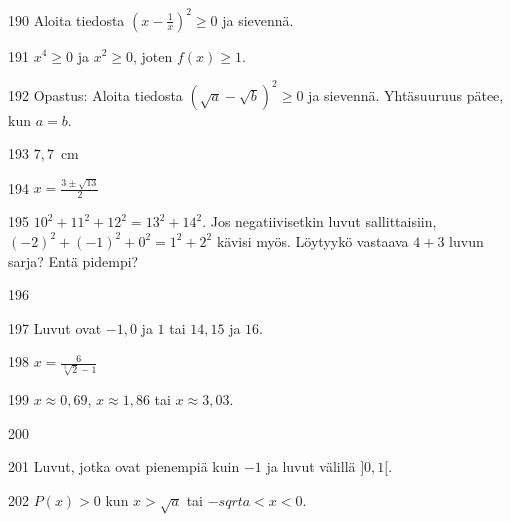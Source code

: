 \begin{Vastaus}{190}
     Aloita tiedosta $\left(x-\frac{1}{x}\right)^2 \geq 0$ ja sievennä.
    
\end{Vastaus}
\begin{Vastaus}{191}
     $x^4\geq 0$ ja $x^2 \geq 0$, joten $f(x) \geq 1$.
    
\end{Vastaus}
\begin{Vastaus}{192}
     Opastus: Aloita tiedosta $\left(\sqrt{a}-\sqrt{b}\right)^2 \geq 0$ ja sievennä. Yhtäsuuruus pätee, kun $a = b$.
    
\end{Vastaus}
\begin{Vastaus}{193}
     $7,7$~cm
    
\end{Vastaus}
\begin{Vastaus}{194}
    $x =\frac{3 \pm \sqrt{13}}{2}$
    
\end{Vastaus}
\begin{Vastaus}{195}
		$10^2+11^2+12^2 = 13^2 + 14^2$.
    	Jos negatiivisetkin luvut sallittaisiin, $(-2)^2+(-1)^2+0^2 = 1^2 + 2^2$ kävisi 			myös. Löytyykö vastaava $4 + 3$ luvun sarja? Entä pidempi?
    
\end{Vastaus}
\begin{Vastaus}{196}
		\begin{alakohdat}
		\end{alakohdat}
    
\end{Vastaus}
\begin{Vastaus}{197}
	Luvut ovat $-1, 0$ ja $1$ tai $14, 15$ ja $16$.
    
\end{Vastaus}
\begin{Vastaus}{198}
	$x=\frac{6}{\sqrt[5]{2}-1}$
    
\end{Vastaus}
\begin{Vastaus}{199}
	$x \approx 0,69$, $x \approx 1,86$ tai $x \approx 3,03$.
    
\end{Vastaus}
\begin{Vastaus}{200}
		\begin{alakohdat}
		\alakohta{$-5<x<0$ tai $3 < x$}
		\alakohta{$x<0$ tai $x = 1$}
		\end{alakohdat}
    
\end{Vastaus}
\begin{Vastaus}{201}
	Luvut, jotka ovat pienempiä kuin $-1$ ja luvut välillä $]0,1[$.
    
\end{Vastaus}
\begin{Vastaus}{202}
	$P(x)>0$ kun $x > \sqrt{a}$ tai $-sqrt{a}<x<0$.
    
\end{Vastaus}
